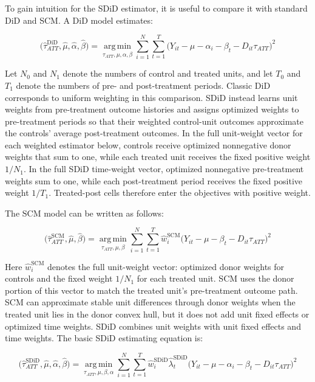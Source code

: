 \documentclass[referee,pdflatex,sn-basic]{sn-jnl}
\theoremstyle{thmstylethree}
\begin{document}
To gain intuition for the SDiD estimator, it is useful to compare it with standard DiD and SCM. A DiD model estimates:

\[
\bigl(\hat{\tau}_{ATT}^{\text{DiD}}, \hat{\mu}, \hat{\alpha}, \hat{\beta}\bigr)
=
\operatorname*{arg\,min}_{\tau_{ATT},\mu, \alpha, \beta}
\sum_{i=1}^{N}\sum_{t=1}^{T}
\bigl(Y_{it}-\mu-\alpha_i -\beta_t-D_{it}\tau_{ATT}\bigr)^2
\]

Let \(N_0\) and \(N_1\) denote the numbers of control and treated units, and let \(T_0\) and \(T_1\) denote the numbers of pre- and post-treatment periods. Classic DiD corresponds to uniform weighting in this comparison. SDiD instead learns unit weights from pre-treatment outcome histories and assigns optimized weights to pre-treatment periods so that their weighted control-unit outcomes approximate the controls' average post-treatment outcomes. In the full unit-weight vector for each weighted estimator below, controls receive optimized nonnegative donor weights that sum to one, while each treated unit receives the fixed positive weight \(1/N_1\). In the full SDiD time-weight vector, optimized nonnegative pre-treatment weights sum to one, while each post-treatment period receives the fixed positive weight \(1/T_1\). Treated-post cells therefore enter the objectives with positive weight.

The SCM model can be written as follows:

\[
\bigl(\hat{\tau}_{ATT}^{\text{SCM}}, \hat{\mu}, \hat{\beta}\bigr)
=
\operatorname*{arg\,min}_{\tau_{ATT}, \mu, \beta}
\sum_{i=1}^{N}\sum_{t=1}^{T}
\hat{w}^{\text{SCM}}_i
\bigl(Y_{it}-\mu-\beta_t-D_{it}\tau_{ATT}\bigr)^2
\]

Here \(\hat{w}^{\text{SCM}}_i\) denotes the full unit-weight vector: optimized donor weights for controls and the fixed weight \(1/N_1\) for each treated unit. SCM uses the donor portion of this vector to match the treated unit's pre-treatment outcome path. SCM can approximate stable unit differences through donor weights when the treated unit lies in the donor convex hull, but it does not add unit fixed effects or optimized time weights. SDiD combines unit weights with unit fixed effects and time weights. The basic SDiD estimating equation is:

\[
\bigl(\hat{\tau}_{ATT}^{\text{SDiD}}, \hat{\mu}, \hat{\alpha}, \hat{\beta} \bigr)
=
\operatorname*{arg\,min}_{\tau_{ATT},\mu,\beta, \alpha}
\sum_{i=1}^{N}\sum_{t=1}^{T}
\hat{w}^{\text{SDiD}}_i \hat{\lambda}^{\text{SDiD}}_t
\bigl(Y_{it}- \mu- \alpha_i - \beta_t-D_{it}\tau_{ATT}\bigr)^2
\]
\end{document}
